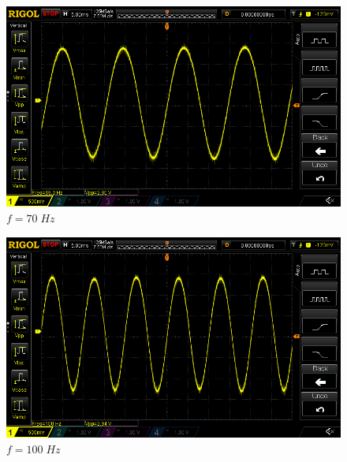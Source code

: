 \documentclass[uplatex,a4paper,11pt,oneside,openany]{jsbook}
\begin{document}
\begin{spacing}{0.67}
  \begin{multicols}{2}
    \begin{figure}[H]
       \centering
        \includegraphics[keepaspectratio, scale=0.28, angle=0]
                    {rigol/figs/FrqCharM1Y1_2kR/70hz.png}
                    \caption{$f=70\;Hz$}
                    \label{fig:frq70}
    \end{figure}
  
    \begin{figure}[H]
       \centering
        \includegraphics[keepaspectratio, scale=0.28, angle=0]
                  {rigol/figs/FrqCharM1Y1_2kR/100hz.png}
                  \caption{$f=100\;Hz$}
                  \label{fig:frq100}
    \end{figure}
  \end{multicols}


\end{spacing}
\end{document}
